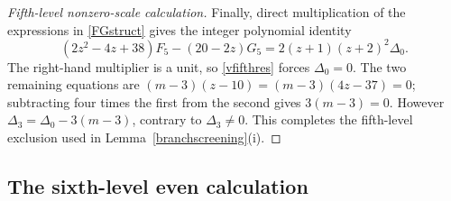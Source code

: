 \documentclass[12pt]{article}
\theoremstyle{remark}
\begin{document}
\begin{proof}[Fifth-level nonzero-scale calculation]
Finally, direct multiplication of the expressions in \eqref{FGstruct}
gives the integer polynomial identity
\begin{equation*}
 (2z^2-4z+38)F_5-(20-2z)G_5
       =2(z+1)(z+2)^2\Delta_0.
\end{equation*}
The right-hand multiplier is a unit, so \eqref{vfifthres} forces
$\Delta_0=0$.  The two remaining equations are
$(m-3)(z-10)=(m-3)(4z-37)=0$; subtracting four times the first from the
second gives $3(m-3)=0$.  However
$\Delta_3=\Delta_0-3(m-3)$, contrary to $\Delta_3\ne0$.  This completes the fifth-level exclusion
used in Lemma~\ref{branchscreening}(i).
\end{proof}

\subsection{The sixth-level even calculation}\label{app:even}
\end{document}
